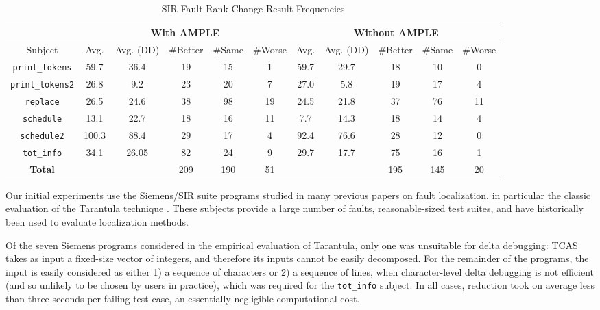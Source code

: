 \begin{table}
\begin{center}
\begin{tabular}{|c||c|c|c|c|c||c|c|c|c|c|}
\hline
\hline
& \multicolumn{5}{|c|}{With AMPLE} & \multicolumn{5}{|c|}{Without AMPLE} \\
\hline
Subject & Avg. & Avg. (DD) & \#Better & \#Same & \#Worse & Avg. & Avg. (DD) & \#Better & \#Same & \#Worse \\
\hline
\hline
{\tt print\_tokens} & 59.7 & 36.4 & 19 & 15 & 1 & 59.7 & 29.7 & 18 & 10 & 0 \\
\hline
{\tt print\_tokens2} & 26.8 & 9.2 & 23 & 20 & 7 & 27.0 & 5.8 & 19 & 17 & 4 \\
\hline
{\tt replace} & 26.5 & 24.6 & 38 & 98 & 19 & 24.5 & 21.8 & 37 & 76 & 11 \\
\hline
{\tt schedule} & 13.1 & 22.7 & 18 & 16 & 11 & 7.7 & 14.3 & 18 & 14 & 4 \\
\hline
{\tt schedule2} & 100.3 & 88.4 & 29 & 17 & 4 & 92.4 & 76.6 & 28 & 12 & 0 \\ 
\hline
{\tt tot\_info} & 34.1 & 26.05 & 82 & 24 & 9 & 29.7 & 17.7 & 75 & 16 & 1\\
\hline
\hline
{\bf Total} & & & 209 & 190 & 51 & & & 195 & 145 & 20 \\
\hline
\hline
\end{tabular}
\end{center}
\caption{SIR Fault Rank Change Result Frequencies}
\label{tab:avgimproved}
\end{table}

Our initial experiments use the Siemens/SIR \cite{doESE05,Siemens}
suite programs studied in many previous papers on fault localization,
in particular the classic evaluation of the Tarantula technique
\cite{Tarantula}.  These subjects provide a large number of faults,
reasonable-sized test suites, and have historically been used to
evaluate localization methods.

Of the seven Siemens programs considered in the empirical evaluation
of Tarantula, only one was unsuitable for delta debugging: TCAS takes
as input a fixed-size vector of integers, and therefore its inputs
cannot be easily decomposed.  For the remainder of the programs, the
input is easily considered as either 1) a sequence of characters or 2)
a sequence of lines, when character-level delta debugging is not
efficient (and so unlikely to be chosen by users in practice), which
was required for the {\tt tot\_info} subject.  In all cases, reduction
took on average less than three seconds per failing test case, an essentially
negligible computational cost.




